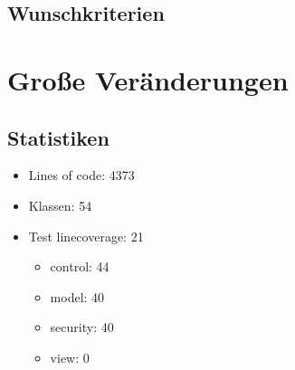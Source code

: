 \subsection{Wunschkriterien}


\section{Große Veränderungen}


\begin{frame}
	\section{Statistiken}
	\begin{itemize}
		\item Lines of code: 4373
		\item Klassen: 54
		\item Test linecoverage: 21%
		\begin{itemize}
			\item control: 44%
			\item model: 40%
			\item security: 40%
			\item view: 0%
		\end{itemize}
	\end{itemize}
\end{frame}


